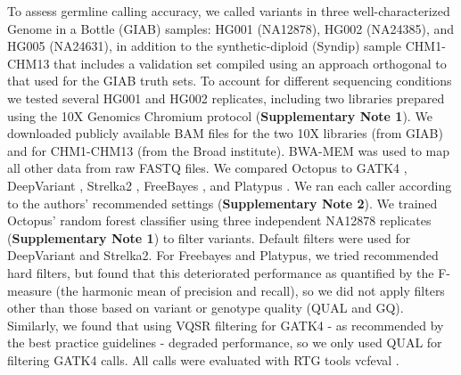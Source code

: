 \documentclass[notitlepage, twocolumn, 10pt]{article}
\begin{document}
To assess germline calling accuracy, we called variants in three well-characterized Genome in a Bottle (GIAB) \cite{RN153} samples: HG001 (NA12878), HG002 (NA24385), and HG005 (NA24631), in addition to the synthetic-diploid (Syndip) sample CHM1-CHM13 \cite{RN605} that includes a validation set compiled using an approach orthogonal to that used for the GIAB truth sets. To account for different sequencing conditions we tested several HG001 and HG002 replicates, including two libraries prepared using the 10X Genomics Chromium protocol (\textbf{Supplementary Note 1}). We downloaded publicly available BAM files for the two 10X libraries (from GIAB) and for CHM1-CHM13 (from the Broad institute). BWA-MEM \cite{RN539} was used to map all other data from raw FASTQ files. We compared Octopus to GATK4 \cite{RN598}, DeepVariant \cite{RN619}, Strelka2 \cite{RN604}, FreeBayes \cite{RN538}, and Platypus \cite{RN5}. We ran each caller according to the authors' recommended settings (\textbf{Supplementary Note 2}). We trained Octopus' random forest classifier using three independent NA12878 replicates (\textbf{Supplementary Note 1}) to filter variants. Default filters were used for DeepVariant and Strelka2. For Freebayes and Platypus, we tried recommended hard filters, but found that this deteriorated performance as quantified by the F-measure (the harmonic mean of precision and recall), so we did not apply filters other than those based on variant or genotype quality (QUAL and GQ). Similarly, we found that using VQSR filtering for GATK4 - as recommended by the best practice guidelines - degraded performance, so we only used QUAL for filtering GATK4 calls. All calls were evaluated with RTG tools vcfeval \cite{RN169}.
\end{document}
